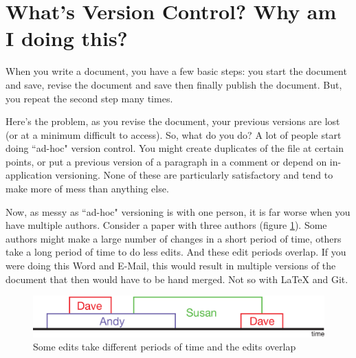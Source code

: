 \section*{What's Version Control? Why am I doing this?}

When you write a document, you have a few basic steps: you start the document and save, revise the document and save then finally publish the document.  But, you repeat the second step many times.

Here's the problem, as you revise the document, your previous versions are lost (or at a minimum difficult to access).  So, what do you do?  A lot of people start doing ``ad-hoc" version control.  You might create duplicates of the file at certain points, or put a previous version of a paragraph in a comment or depend on in-application versioning.  None of these are particularly satisfactory and tend to make more of mess than anything else.

Now, as messy as ``ad-hoc" versioning is with one person, it is far worse when you have multiple authors.  Consider a paper with three authors (figure \ref{fig:timeline}).  Some authors might make a large number of changes in a short period of time, others take a long period of time to do less edits.  And these edit periods overlap.  If you were doing this Word and E-Mail, this would result in multiple versions of the document that then would have to be hand merged. Not so with LaTeX and Git.

\begin{figure}[hbt]
	\centering
  	\includegraphics[width=6in]{graphics/timeline.eps}
  	\caption{Some edits take different periods of time and the edits overlap}
  	\label{fig:timeline}
\end{figure}